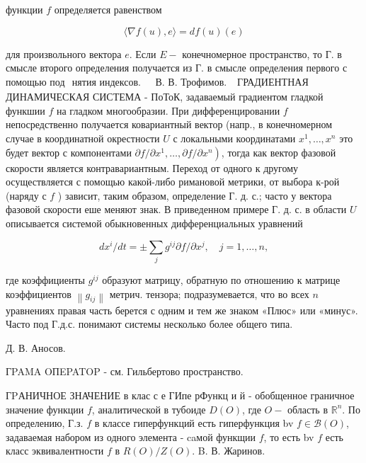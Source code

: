 \documentclass[10pt]{article}
\begin{document}
функции $f$ определяется равенством



\[

\langle\nabla f(u), e\rangle=d f(u)(e)

\]



для произвольного вектора $e$. Если $E-$ конечномерное пространство, то Г. в смысле второго определения получается из Г. в смысле определения первого с помощью под$\begin{array}{ll}\text { нятия индексов. } & \text { В. В. Трофимов. }\end{array}$ ГРАДИЕНТНАЯ ДИНАМИЧЕСКАЯ СИСТЕМА - ПоТоК, задаваемый градиентом гладкой функшии $f$ на гладком многообразии. При дифференцировании $f$ непосредственно получается ковариантный вектор (напр., в конечномерном случае в координатной окрестности $U$ с локальными координатами $x^{1}, \ldots, x^{n}$ это будет вектор с компонентами $\left.\partial f / \partial x^{1}, \ldots, \partial f / \partial x^{n}\right)$, тогда как вектор фазовой скорости является контравариантным. Переход от одного к другому осуществляется с помощью какой-либо римановой метрики, от выбора к-рой (наряду с $f$ ) зависит, таким образом, определение Г. д. с.; часто у вектора фазовой скорости еше меняют знак. В приведенном примере Г. д. с. в области $U$ описывается системой обыкновенных дифференциальных уравнений



\[

d x^{i} / d t= \pm \sum_{j} g^{i j} \partial f / \partial x^{j}, \quad j=1, \ldots, n,

\]



где коэффициенты $g^{i j}$ образуют матрицу, обратную по отношению к матрице коэффициентов $\left\|g_{i j}\right\|$ метрич. тензора; подразумевается, что во всех $n$ уравнениях правая часть берется с одним и тем же знаком «Плюс» или «минус». Часто под Г.д.с. понимают системы несколько более общего типа.



Д. В. Аносов.



ГPAMA OПEPATOP - см. Гильбертово пространство.



ГPАНИЧНОЕ ЗНАЧЕНИЕ в клас с е ГИпе рФункц и й - обобщенное граничное значение функции $f$, аналитической в тубоиде $D(O)$, где $O-$ область в $\mathbb{R}^{n}$. По определению, Г.з. $f$ в классе гиперфункций есть гиперфункция bv $f \in \mathscr{B}(O)$, задаваемая набором из одного элемента - caмой функщии $f$, то есть bv $f$ есть класс эквивалентности $f$ в $R(O) / Z(O)$. B. В. Жаринов.
\end{document}
